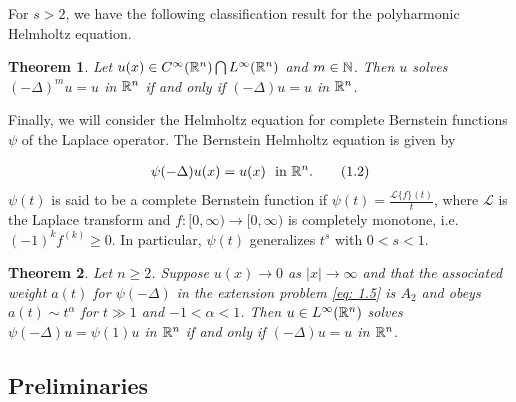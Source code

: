 \documentclass{article}
\newtheorem{theorem}{Theorem}[section]
\begin{document}
For $s>2$, we have the following classification result for the polyharmonic Helmholtz equation.

\begin{theorem}
\label{Th 1.2-2}
Let $u(x) \in C^\infty(\mathbb{R}^n) \bigcap L^\infty(\mathbb{R}^n)$ and $ m \in \mathbb{N}$.  Then $u$ solves  $(-\Delta)^m u = u$  in $\mathbb{R}^n$  if and only if $(-\Delta) u = u$ in $\mathbb{R}^n$. 
\end{theorem}


Finally, we will consider the Helmholtz equation for complete Bernstein functions $\psi$ of the Laplace operator. The Bernstein Helmholtz equation is given by

\begin{align*}
    \psi(-\Delta) u(x) = u(x) \ \ \mbox{in} \ \mathbb{R}^n.
    \tag{1.2}\label{eq: 1.2}
\end{align*}
$\psi(t)$ is said to be a complete Bernstein function if $\psi(t)=\frac{\mathcal{L}\{f\}(t)}{t}$, where $\mathcal{L}$ is the Laplace transform and $f: [0, \infty) \to [0, \infty)$ is completely monotone, i.e. $(-1)^k f^{(k)} \ge 0$. In particular, $\psi(t)$ generalizes $t^s$ with $0<s<1$.

\begin{theorem}
\label{Th 1.3}
Let $n\geq 2$. Suppose $u(x) \to 0$ as $|x| \to \infty$ and that the associated weight $a(t)$ for $\psi(-\Delta)$ in the extension problem \eqref{eq: 1.5} is $A_2$ and obeys $a(t) \sim t^{\alpha}$ for $t\gg 1$ and $-1<\alpha<1$. Then $u \in L^\infty(\mathbb{R}^n)$ solves $\psi(-\Delta) u = \psi(1)u$ in $\mathbb{R}^n$ if and only if $(-\Delta) u = u$ in $\mathbb{R}^n$.
\end{theorem}

\newpage

\subsection{Preliminaries}
\end{document}
